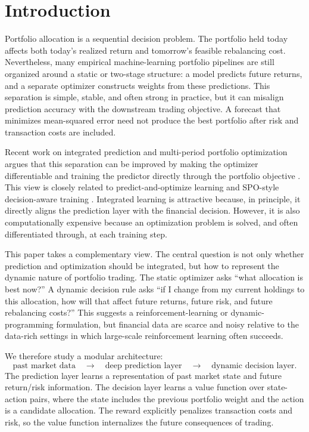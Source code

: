 \documentclass[11pt]{article}
\begin{document}
\section{Introduction}

Portfolio allocation is a sequential decision problem. The portfolio held today affects both today's realized return and tomorrow's feasible rebalancing cost. Nevertheless, many empirical machine-learning portfolio pipelines are still organized around a static or two-stage structure: a model predicts future returns, and a separate optimizer constructs weights from these predictions. This separation is simple, stable, and often strong in practice, but it can misalign prediction accuracy with the downstream trading objective. A forecast that minimizes mean-squared error need not produce the best portfolio after risk and transaction costs are included.

Recent work on integrated prediction and multi-period portfolio optimization argues that this separation can be improved by making the optimizer differentiable and training the predictor directly through the portfolio objective \citep{LinghuLiuDeng2025IPMO}. This view is closely related to predict-and-optimize learning and SPO-style decision-aware training \citep{ElmachtoubGrigas2022}. Integrated learning is attractive because, in principle, it directly aligns the prediction layer with the financial decision. However, it is also computationally expensive because an optimization problem is solved, and often differentiated through, at each training step.

This paper takes a complementary view. The central question is not only whether prediction and optimization should be integrated, but how to represent the dynamic nature of portfolio trading. The static optimizer asks ``what allocation is best now?'' A dynamic decision rule asks ``if I change from my current holdings to this allocation, how will that affect future returns, future risk, and future rebalancing costs?'' This suggests a reinforcement-learning or dynamic-programming formulation, but financial data are scarce and noisy relative to the data-rich settings in which large-scale reinforcement learning often succeeds.

We therefore study a modular architecture:
\[
\text{past market data}
\quad\longrightarrow\quad
\text{deep prediction layer}
\quad\longrightarrow\quad
\text{dynamic decision layer}.
\]
The prediction layer learns a representation of past market state and future return/risk information. The decision layer learns a value function over state-action pairs, where the state includes the previous portfolio weight and the action is a candidate allocation. The reward explicitly penalizes transaction costs and risk, so the value function internalizes the future consequences of trading.
\end{document}
